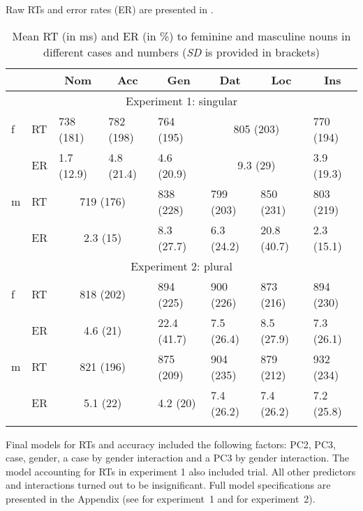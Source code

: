 \documentclass[output=paper, modfonts,newtxmath,hidelinks]{langscibook}
\begin{document}
Raw RTs and error rates (ER) are presented in .
\begin{table}
    \caption{Mean RT (in ms) and ER (in \%) to feminine and masculine nouns in different cases and numbers (\textit{SD} is provided in brackets)}
    \label{tab:descrSg}
    \begin{tabular}{*{8}l}
        \lsptoprule
        ~   &   ~   &    \multicolumn{1}{c}{Nom}    &   \multicolumn{1}{c}{Acc} &   \multicolumn{1}{c}{Gen} &  \multicolumn{1}{c}{Dat} &   \multicolumn{1}{c}{Loc}  &   \multicolumn{1}{c}{Ins}\\
        \midrule
        \multicolumn{8}{c}{Experiment 1: singular}\\
        \midrule
        f   &   RT  &   738 (181)   &   782 (198)		&  764 (195)    & \multicolumn{2}{c}{ 805 (203)} &   770 (194)\\
        ~   &   ER  &   1.7 (12.9)  &    4.8 (21.4)   &  4.6 (20.9)   &   \multicolumn{2}{c}{9.3 (29)}  &   3.9 (19.3)\\
        m   &   RT  &   \multicolumn{2}{c}{719 (176)}    &   838 (228)   &   799 (203)    &   850 (231) &   803 (219)  \\
        ~   &   ER  &   \multicolumn{2}{c}{2.3 (15)}    &   8.3 (27.7)  &   6.3 (24.2) &  20.8 (40.7) &   2.3 (15.1) \\
        \midrule
        \multicolumn{8}{c}{Experiment 2: plural}\\
        \midrule
        f   &   RT  &   \multicolumn{2}{c}{818	(202)}   &	894 (225)   &   900 (226)   &   873 (216)
&	894 (230)   \\
        ~   &   ER  &   \multicolumn{2}{c}{4.6  (21)}    &	22.4 (41.7) &	7.5 (26.4)  &	8.5 (27.9)  &	7.3	(26.1)\\ 
        m   &   RT  &   \multicolumn{2}{c}{821 (196)}     &   875	(209)   &   904 (235)   &   879	(212)   &   932 (234) \\
        ~   &   ER  &  \multicolumn{2}{c}{5.1 (22)}  &   4.2	(20)    &	7.4 (26.2) &   7.4 (26.2)   &   7.2 (25.8)  \\
        \lspbottomrule
    \end{tabular}
\end{table}

Final models for RTs and accuracy included the following factors: PC2, PC3, case, gender, a case by gender interaction and a PC3 by gender interaction. The model accounting for RTs in experiment 1 also included trial. All other predictors and interactions turned out to be insignificant. Full model specifications are presented in the Appendix (see  for experiment~1 and  for experiment~2).
\end{document}
